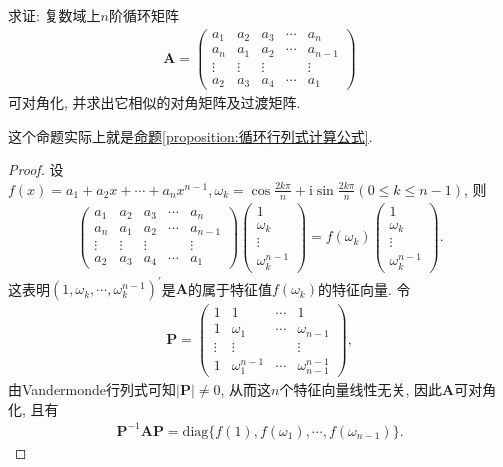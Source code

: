 \documentclass[../../main.tex]{subfiles}
\begin{document}
\begin{proposition}[循环矩阵一定可对角化]\label{proposition:循环矩阵一定可对角化}
求证: 复数域上\(n\)阶循环矩阵
\begin{align*}
\boldsymbol{A}=\begin{pmatrix}
a_{1}&a_{2}&a_{3}&\cdots&a_{n}\\
a_{n}&a_{1}&a_{2}&\cdots&a_{n - 1}\\
\vdots&\vdots&\vdots&&\vdots\\
a_{2}&a_{3}&a_{4}&\cdots&a_{1}
\end{pmatrix}
\end{align*}
可对角化, 并求出它相似的对角矩阵及过渡矩阵.
\end{proposition}
\begin{note}
这个命题实际上就是\hyperref[proposition:循环行列式计算公式]{命题\ref{proposition:循环行列式计算公式}}.
\end{note}
\begin{proof}
设\(f(x)=a_{1}+a_{2}x+\cdots+a_{n}x^{n - 1},\omega_{k}=\cos\frac{2k\pi}{n}+\mathrm{i}\sin\frac{2k\pi}{n}(0\leq k\leq n - 1)\), 则
\begin{align*}
\begin{pmatrix}
a_{1}&a_{2}&a_{3}&\cdots&a_{n}\\
a_{n}&a_{1}&a_{2}&\cdots&a_{n - 1}\\
\vdots&\vdots&\vdots&&\vdots\\
a_{2}&a_{3}&a_{4}&\cdots&a_{1}
\end{pmatrix}\begin{pmatrix}
1\\
\omega_{k}\\
\vdots\\
\omega_{k}^{n - 1}
\end{pmatrix}=f(\omega_{k})\begin{pmatrix}
1\\
\omega_{k}\\
\vdots\\
\omega_{k}^{n - 1}
\end{pmatrix}.
\end{align*}
这表明\((1,\omega_{k},\cdots,\omega_{k}^{n - 1})^{\prime}\)是\(\boldsymbol{A}\)的属于特征值\(f(\omega_{k})\)的特征向量. 令
\begin{align*}
\boldsymbol{P}=\begin{pmatrix}
1&1&\cdots&1\\
1&\omega_{1}&\cdots&\omega_{n - 1}\\
\vdots&\vdots&&\vdots\\
1&\omega_{1}^{n - 1}&\cdots&\omega_{n - 1}^{n - 1}
\end{pmatrix},
\end{align*}
由Vandermonde行列式可知\(\vert\boldsymbol{P}\vert\neq 0\), 从而这\(n\)个特征向量线性无关, 因此\(\boldsymbol{A}\)可对角化, 且有
\begin{align*}
\boldsymbol{P}^{-1}\boldsymbol{AP}=\mathrm{diag}\{f(1),f(\omega_{1}),\cdots,f(\omega_{n - 1})\}.
\end{align*} 
\end{proof}
\end{document}
